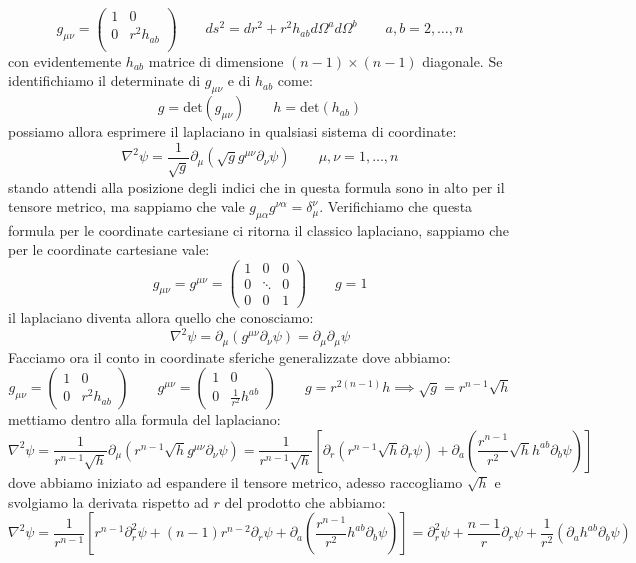 \[g_{\mu\nu} = \begin{pmatrix}
  1 & 0  \\
  0 &r^2h_{ab}\\
 \end{pmatrix} \qquad ds^2 = dr^2 + r^2h_{ab} d\Omega^ad\Omega^b \qquad a,b=2,\dots,n\]
 con evidentemente $h_{ab}$ matrice di dimensione $(n-1)\times (n-1)$ diagonale. Se identifichiamo il determinate di $g_{\mu\nu}$ e di $h_{ab}$ come:
 \[g = \text{det}(g_{\mu\nu}) \qquad h = \text{det}(h_{ab})\]
possiamo allora esprimere il laplaciano in qualsiasi sistema di coordinate:
\[\nabla^2\psi = \frac{1}{\sqrt{g}}\partial_\mu(\sqrt{g}g^{\mu\nu}\partial_\nu \psi)\qquad \mu,\nu=1,\dots,n\]
stando attendi alla posizione degli indici che in questa formula sono in alto per il tensore metrico, ma sappiamo che vale $g_{\mu\alpha}g^{\nu\alpha} = \delta_\mu^\nu$. Verifichiamo che questa formula per le coordinate cartesiane ci ritorna il classico laplaciano, sappiamo che per le coordinate cartesiane vale:
\[ g_{\mu\nu} =  g^{\mu\nu} =
 \begin{pmatrix}
  1 & 0 &  0 \\
  0 & \ddots & 0\\
  0 & 0 & 1
 \end{pmatrix}\qquad g = 1 \]
il laplaciano diventa allora quello che conosciamo:
\[\nabla^2\psi = \partial_\mu(g^{\mu\nu}\partial_\nu \psi) = \partial_\mu\partial_\mu \psi\]
Facciamo ora il conto in coordinate sferiche generalizzate dove abbiamo:
\[g_{\mu\nu} = \begin{pmatrix}
  1 & 0  \\
  0 &r^2h_{ab}\end{pmatrix}
  \qquad g^{\mu\nu} = \begin{pmatrix}
  1 & 0  \\
  0 &\frac{1}{r^2}h^{ab}\end{pmatrix} \qquad g = r^{2(n-1)}h \implies \sqrt{g} = r^{n-1}\sqrt{h}\]
mettiamo dentro alla formula del laplaciano:
\[\nabla^2\psi = \frac{1}{r^{n-1}\sqrt{h}}\partial_\mu(r^{n-1}\sqrt{h} g^{\mu\nu}\partial_\nu \psi)  =  \frac{1}{r^{n-1}\sqrt{h}}\left[\partial_r(r^{n-1}\sqrt{h}\partial_r \psi) + \partial_a\left(\frac{r^{n-1}}{r^2}\sqrt{h} h^{ab}\partial_b\psi\right)\right] \]
dove abbiamo iniziato ad espandere il tensore metrico, adesso raccogliamo $\sqrt{h}$ e svolgiamo la derivata rispetto ad $r$ del prodotto che abbiamo:
\[\nabla^2\psi = \frac{1}{r^{n-1}}\left[r^{n-1}\partial_r^2\psi +(n-1)r^{n-2}\partial_r \psi + \partial_a\left(\frac{r^{n-1}}{r^2} h^{ab}\partial_b\psi\right)\right]  = \partial_r^2\psi + \frac{n-1}{r}\partial_r\psi + \frac{1}{r^2}(\partial_a h^{ab}\partial_b\psi)\]
